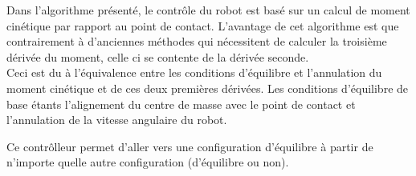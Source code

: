\documentclass[a4paper,12pt]{report}
\begin{document}

Dans l'algorithme présenté, le contrôle du robot est basé sur un calcul de moment cinétique par rapport au point de contact. L'avantage de cet algorithme est que contrairement à d'anciennes méthodes qui nécessitent de calculer la troisième dérivée du moment, celle ci se contente de la dérivée seconde.\\
Ceci est du à l'équivalence entre les conditions d'équilibre et l'annulation du moment cinétique et de ces deux premières dérivées. Les conditions d'équilibre de base étants l'alignement du centre de masse avec le point de contact et l'annulation de la vitesse angulaire du robot.

Ce contrôlleur permet d'aller vers une configuration d'équilibre à partir de n'importe quelle autre configuration (d'équilibre ou non).



\end{document}
